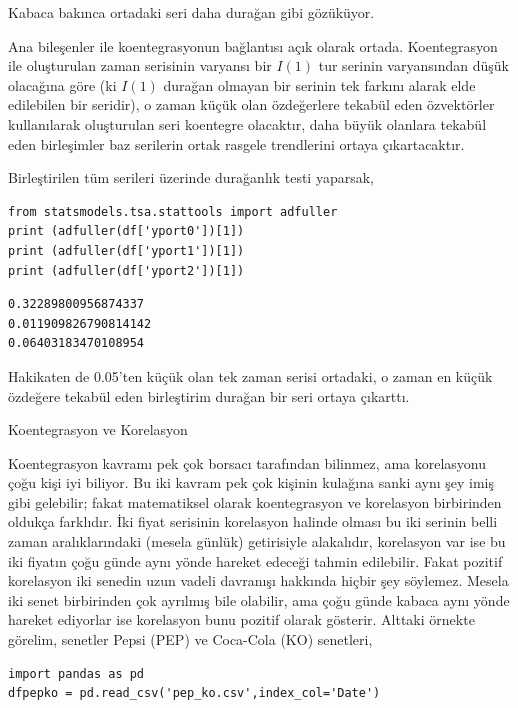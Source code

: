 \documentclass[12pt,fleqn]{article}\usepackage{../../common}
\begin{document}
Kabaca bakınca ortadaki seri daha durağan gibi gözüküyor.

Ana bileşenler ile koentegrasyonun bağlantısı açık olarak ortada.  Koentegrasyon
ile oluşturulan zaman serisinin varyansı bir $I(1)$ tur serinin varyansından
düşük olacağına göre (ki $I(1)$ durağan olmayan bir serinin tek farkını alarak
elde edilebilen bir seridir), o zaman küçük olan özdeğerlere tekabül eden
özvektörler kullanılarak oluşturulan seri koentegre olacaktır, daha büyük
olanlara tekabül eden birleşimler baz serilerin ortak rasgele trendlerini ortaya
çıkartacaktır.

Birleştirilen tüm serileri üzerinde durağanlık testi yaparsak,

\begin{verbatim}
from statsmodels.tsa.stattools import adfuller
print (adfuller(df['yport0'])[1])
print (adfuller(df['yport1'])[1])
print (adfuller(df['yport2'])[1])
\end{verbatim}

\begin{verbatim}
0.32289800956874337
0.011909826790814142
0.06403183470108954
\end{verbatim}

Hakikaten de 0.05'ten küçük olan tek zaman serisi ortadaki, o zaman
en küçük özdeğere tekabül eden birleştirim durağan bir seri ortaya
çıkarttı.

Koentegrasyon ve Korelasyon

Koentegrasyon kavramı pek çok borsacı tarafından bilinmez, ama korelasyonu
çoğu kişi iyi biliyor. Bu iki kavram pek çok kişinin kulağına sanki aynı
şey imiş gibi gelebilir; fakat matematiksel olarak koentegrasyon ve
korelasyon birbirinden oldukça farklıdır. İki fiyat serisinin korelasyon
halinde olması bu iki serinin belli zaman aralıklarındaki (mesela günlük)
getirisiyle alakalıdır, korelasyon var ise bu iki fiyatın çoğu günde aynı
yönde hareket edeceği tahmin edilebilir. Fakat pozitif korelasyon iki
senedin uzun vadeli davranışı hakkında hiçbir şey söylemez. Mesela iki
senet birbirinden çok ayrılmış bile olabilir, ama çoğu günde kabaca aynı
yönde hareket ediyorlar ise korelasyon bunu pozitif olarak
gösterir. Alttaki örnekte görelim, senetler Pepsi (PEP) ve Coca-Cola (KO) 
senetleri,

\begin{verbatim}
import pandas as pd
dfpepko = pd.read_csv('pep_ko.csv',index_col='Date')
\end{verbatim}
\end{document}
